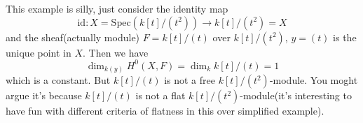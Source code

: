 \documentclass[main.tex]{subfiles}
\begin{document}
\begin{example}
This example is silly, just consider the identity map
$$\mathrm{id}: X=\mathrm{Spec}(k[t]/(t^{2}))\rightarrow k[t]/(t^{2})=X$$
and the sheaf(actually module) $F=k[t]/(t)$ over $k[t]/(t^{2})$, $y=(t)$ is the unique point in $X$. Then we have 
$$\dim_{k(y)}H^{0}(X,F)=\dim_{k}k[t]/(t)=1$$
which is a constant. But $k[t]/(t)$ is not a free $k[t]/(t^{2})$-module. You moght argue it's because $k[t]/(t)$ is not a flat $k[t]/(t^{2})$-module(it's interesting to have fun with different criteria of flatness in this over simplified example).
\end{example}
\end{document}
